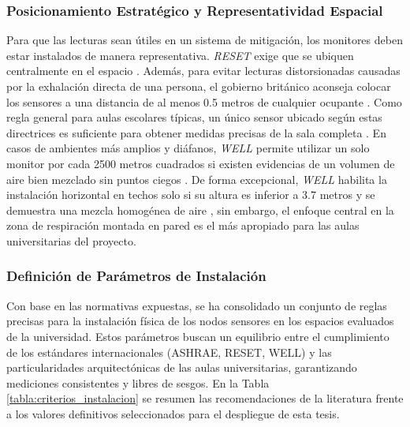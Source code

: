 \subsubsection{Posicionamiento Estratégico y Representatividad Espacial}
Para que las lecturas sean útiles en un sistema de mitigación, los monitores deben estar instalados de manera representativa. \textit{RESET} exige que se ubiquen centralmente en el espacio \cite{reset_standard_v2}. Además, para evitar lecturas distorsionadas causadas por la exhalación directa de una persona, el gobierno británico aconseja colocar los sensores a una distancia de al menos 0.5 metros de cualquier ocupante \cite{gov_uk_ventilation_education}. Como regla general para aulas escolares típicas, un único sensor ubicado según estas directrices es suficiente para obtener medidas precisas de la sala completa \cite{gov_uk_ventilation_education}. En casos de ambientes más amplios y diáfanos, \textit{WELL} permite utilizar un solo monitor por cada 2500 metros cuadrados si existen evidencias de un volumen de aire bien mezclado sin puntos ciegos \cite{well_performance_guidebook}. De forma excepcional, \textit{WELL} habilita la instalación horizontal en techos solo si su altura es inferior a 3.7 metros y se demuestra una mezcla homogénea de aire \cite{well_performance_guidebook}, sin embargo, el enfoque central en la zona de respiración montada en pared es el más apropiado para las aulas universitarias del proyecto.


\subsubsection{Definición de Parámetros de Instalación}
Con base en las normativas expuestas, se ha consolidado un conjunto de reglas precisas para la instalación física de los nodos sensores en los espacios evaluados de la universidad. Estos parámetros buscan un equilibrio entre el cumplimiento de los estándares internacionales (ASHRAE, RESET, WELL) y las particularidades arquitectónicas de las aulas universitarias, garantizando mediciones consistentes y libres de sesgos. En la Tabla \ref{tabla:criterios_instalacion} se resumen las recomendaciones de la literatura frente a los valores definitivos seleccionados para el despliegue de esta tesis.

